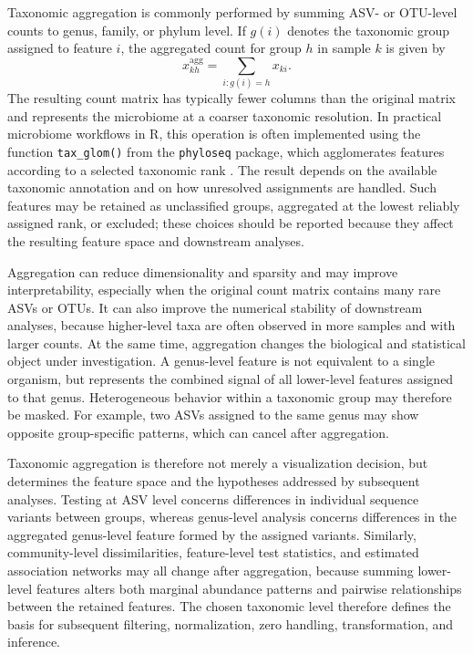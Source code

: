 Taxonomic aggregation is commonly performed by summing ASV- or OTU-level counts to genus, family, or phylum level. If $g(i)$ denotes the taxonomic group assigned to feature $i$, the aggregated count for group $h$ in sample $k$ is given by
\begin{equation}
x^{\mathrm{agg}}_{kh} = \sum_{i:g(i)=h} x_{ki}.
\label{eq:2micro:taxonomic_aggregation}
\end{equation}
The resulting count matrix has typically fewer columns than the original matrix and represents the microbiome at a coarser taxonomic resolution. In practical microbiome workflows in R, this operation is often implemented using the function \texttt{tax\_glom()} from the \texttt{phyloseq} package, which agglomerates features according to a selected taxonomic rank \citep{mcmurdie2013phyloseq}. The result depends on the available taxonomic annotation and on how unresolved assignments are handled. Such features may be retained as unclassified groups, aggregated at the lowest reliably assigned rank, or excluded; these choices should be reported because they affect the resulting feature space and downstream analyses.

Aggregation can reduce dimensionality and sparsity and may improve interpretability, especially when the original count matrix contains many rare ASVs or OTUs. It can also improve the numerical stability of downstream analyses, because higher-level taxa are often observed in more samples and with larger counts. At the same time, aggregation changes the biological and statistical object under investigation. A genus-level feature is not equivalent to a single organism, but represents the combined signal of all lower-level features assigned to that genus. Heterogeneous behavior within a taxonomic group may therefore be masked. For example, two ASVs assigned to the same genus may show opposite group-specific patterns, which can cancel after aggregation.

Taxonomic aggregation is therefore not merely a visualization decision, but determines the feature space and the hypotheses addressed by subsequent analyses. Testing at ASV level concerns differences in individual sequence variants between groups, whereas genus-level analysis concerns differences in the aggregated genus-level feature formed by the assigned variants. Similarly, community-level dissimilarities, feature-level test statistics, and estimated association networks may all change after aggregation, because summing lower-level features alters both marginal abundance patterns and pairwise relationships between the retained features. The chosen taxonomic level therefore defines the basis for subsequent filtering, normalization, zero handling, transformation, and inference.

